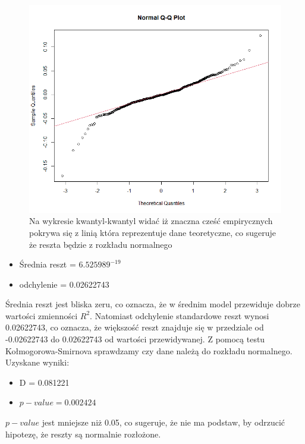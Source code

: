 \documentclass[a4paper,11pt]{article}
\def\\{\hfill\break}
\begin{document}
 \begin{figure}[H]
    \includegraphics[width=12cm]{Wykresy/qqplot reszty.png}
     \caption{Na wykresie kwantyl-kwantyl widać iż znaczna cześć empirycznych pokrywa się z linią która reprezentuje dane teoretyczne, co sugeruje że reszta będzie z rozkładu normalnego}
     
\end{figure}

\begin{itemize}
\item Średnia reszt = $6.525989^{-19}$
\item odchylenie = 0.02622743
\end{itemize} 

Średnia reszt jest bliska zeru, co oznacza, że w średnim model przewiduje dobrze wartości zmienności $R^2$. Natomiast odchylenie standardowe reszt wynosi 0.02622743, co oznacza, że większość reszt znajduje się w przedziale od -0.02622743 do 0.02622743 od wartości przewidywanej.
\\\\
Z pomocą testu Kołmogorowa-Smirnova sprawdzamy czy dane należą do rozkładu normalnego.
Uzyskane wyniki:
\\
\begin{itemize}
\item D = 0.081221
\item $p-value = 0.002424$
\end{itemize} 

 $p-value$ jest mniejsze niż 0.05, co sugeruje, że nie ma podstaw, by odrzucić hipotezę, że reszty są normalnie rozłożone.
\end{document}
